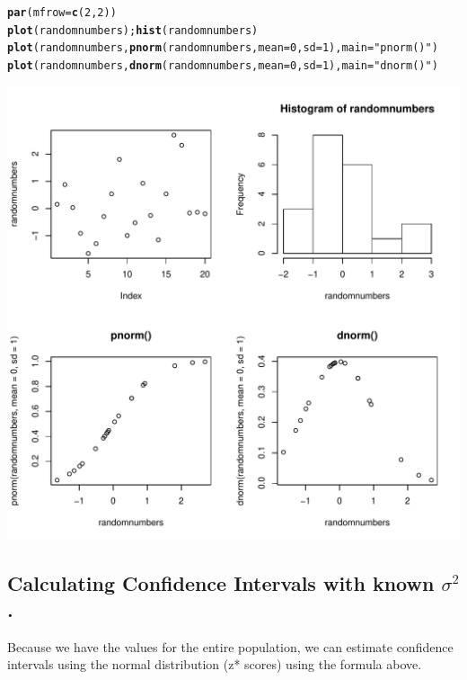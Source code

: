 \documentclass{tufte-handout}\usepackage[]{graphicx}\usepackage[]{color}
\makeatletter
\def\maxwidth{ %
  \ifdim\Gin@nat@width>\linewidth
    \linewidth
  \else
    \Gin@nat@width
  \fi
}
\newcommand{\hlnum}[1]{\textcolor[rgb]{0.686,0.059,0.569}{#1}}%
\newcommand{\hlstr}[1]{\textcolor[rgb]{0.192,0.494,0.8}{#1}}%
\newcommand{\hlstd}[1]{\textcolor[rgb]{0.345,0.345,0.345}{#1}}%
\newcommand{\hlkwc}[1]{\textcolor[rgb]{0.333,0.667,0.333}{#1}}%
\newcommand{\hlkwd}[1]{\textcolor[rgb]{0.737,0.353,0.396}{\textbf{#1}}}%
\newenvironment{kframe}{%
 \def\at@end@of@kframe{}%
 \ifinner\ifhmode%
  \def\at@end@of@kframe{\end{minipage}}%
  \begin{minipage}{\columnwidth}%
 \fi\fi%
 \def\FrameCommand##1{\hskip\@totalleftmargin \hskip-\fboxsep
 \colorbox{shadecolor}{##1}\hskip-\fboxsep
     \hskip-\linewidth \hskip-\@totalleftmargin \hskip\columnwidth}%
 \MakeFramed {\advance\hsize-\width
   \@totalleftmargin\z@ \linewidth\hsize
   \@setminipage}}%
 {\par\unskip\endMakeFramed%
 \at@end@of@kframe}
\newenvironment{knitrout}{}{} %
\makeatother
\begin{document}
\begin{knitrout}
\color{fgcolor}\begin{kframe}
\begin{alltt}
\hlkwd{par}\hlstd{(}\hlkwc{mfrow}\hlstd{=}\hlkwd{c}\hlstd{(}\hlnum{2}\hlstd{,}\hlnum{2}\hlstd{))}
\hlkwd{plot}\hlstd{(randomnumbers);} \hlkwd{hist}\hlstd{(randomnumbers)}
\hlkwd{plot}\hlstd{(randomnumbers,} \hlkwd{pnorm}\hlstd{(randomnumbers,} \hlkwc{mean}\hlstd{=}\hlnum{0}\hlstd{,} \hlkwc{sd}\hlstd{=}\hlnum{1}\hlstd{),} \hlkwc{main}\hlstd{=}\hlstr{"pnorm()"}\hlstd{)}
\hlkwd{plot}\hlstd{(randomnumbers,} \hlkwd{dnorm}\hlstd{(randomnumbers,} \hlkwc{mean}\hlstd{=}\hlnum{0}\hlstd{,} \hlkwc{sd}\hlstd{=}\hlnum{1}\hlstd{),} \hlkwc{main}\hlstd{=}\hlstr{"dnorm()"}\hlstd{)}
\end{alltt}
\end{kframe}
\includegraphics[width=\maxwidth]{figure/unnamed-chunk-27-1} 

\end{knitrout}

\subsection{Calculating Confidence Intervals with known $\sigma^2$.}

Because we have the values for the entire population, we can estimate confidence intervals using the normal distribution (z* scores) using the formula above. 
\end{document}
